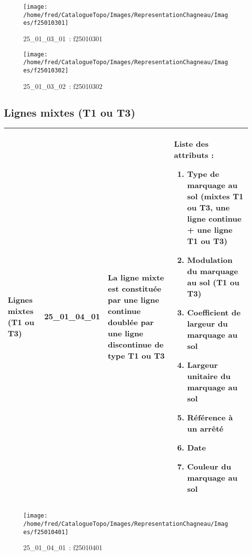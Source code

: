 \documentclass[12pt,titlepage]{book}
\begin{document}
\begin{figure}[h!]
  \hfill         %
  \begin{minipage}[t]{3cm}
    \begin{center}
      \texttt{[image: /home/fred/CatalogueTopo/Images/RepresentationChagneau/Images/f25010301]}
      \caption[~25\_01\_03\_01]{\small{25\_01\_03\_01~:} \tiny{f25010301}}\label{f25010301}
    \end{center}
  \end{minipage}
  \begin{minipage}[t]{3cm}
    \begin{center}
      \texttt{[image: /home/fred/CatalogueTopo/Images/RepresentationChagneau/Images/f25010302]}
      \caption[~25\_01\_03\_02]{\small{25\_01\_03\_02~:} \tiny{f25010302}}\label{f25010302}
    \end{center}
  \end{minipage}
\end{figure}


\subsection{Lignes mixtes (T1 ou T3)}
\noindent
\vspace{\baselineskip}

\renewcommand{\arraystretch}{1.2}
\begin{supertabular}{|p{10cm}|c|p{13cm}|p{12cm}|}
 Lignes mixtes (T1 ou T3) & 25\_01\_04\_01 & La ligne mixte est constituée par une ligne continue doublée par une ligne discontinue de type T1 ou T3 & Liste des attributs :
\begin{enumerate}
  \item Type de marquage au sol (mixtes T1 ou T3, une ligne continue + une ligne T1 ou T3)  \item Modulation du marquage au sol (T1 ou T3)  \item Coefficient de largeur du marquage au sol  \item Largeur unitaire du marquage au sol  \item Référence à un arrêté  \item Date  \item Couleur du marquage au sol\end{enumerate}
\\
\hline
\end{supertabular}
\begin{figure}[h!]
  \hfill         %
  \begin{minipage}[t]{3cm}
    \begin{center}
      \texttt{[image: /home/fred/CatalogueTopo/Images/RepresentationChagneau/Images/f25010401]}
      \caption[~25\_01\_04\_01]{\small{25\_01\_04\_01~:} \tiny{f25010401}}\label{f25010401}
    \end{center}
  \end{minipage}
\end{figure}
\end{document}
